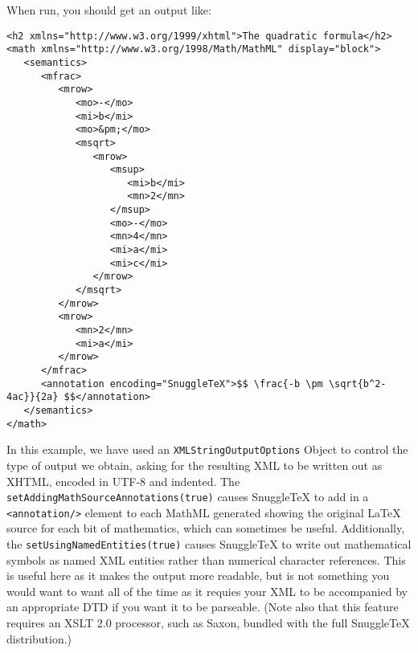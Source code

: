 When run, you should get an output like:

\begin{verbatim}
<h2 xmlns="http://www.w3.org/1999/xhtml">The quadratic formula</h2>
<math xmlns="http://www.w3.org/1998/Math/MathML" display="block">
   <semantics>
      <mfrac>
         <mrow>
            <mo>-</mo>
            <mi>b</mi>
            <mo>&pm;</mo>
            <msqrt>
               <mrow>
                  <msup>
                     <mi>b</mi>
                     <mn>2</mn>
                  </msup>
                  <mo>-</mo>
                  <mn>4</mn>
                  <mi>a</mi>
                  <mi>c</mi>
               </mrow>
            </msqrt>
         </mrow>
         <mrow>
            <mn>2</mn>
            <mi>a</mi>
         </mrow>
      </mfrac>
      <annotation encoding="SnuggleTeX">$$ \frac{-b \pm \sqrt{b^2-4ac}}{2a} $$</annotation>
   </semantics>
</math>
\end{verbatim}

In this example, we have used an \verb|XMLStringOutputOptions| Object to control the type
of output we obtain, asking for the resulting XML to be written out as XHTML, encoded
in UTF-8 and indented. The \verb|setAddingMathSourceAnnotations(true)| causes SnuggleTeX
to add in a \verb|<annotation/>| element to each MathML generated showing the original
LaTeX source for each bit of mathematics, which can sometimes be useful. Additionally,
the \verb|setUsingNamedEntities(true)| causes SnuggleTeX to write out mathematical symbols
as named XML entities rather than numerical character references. This is useful here as it
makes the output more readable, but is not something you would want to want all of the time
as it requies your XML to be accompanied by an appropriate DTD if you want it to be parseable.
(Note also that this feature requires an XSLT 2.0 processor, such as Saxon, bundled with the
full SnuggleTeX distribution.)
